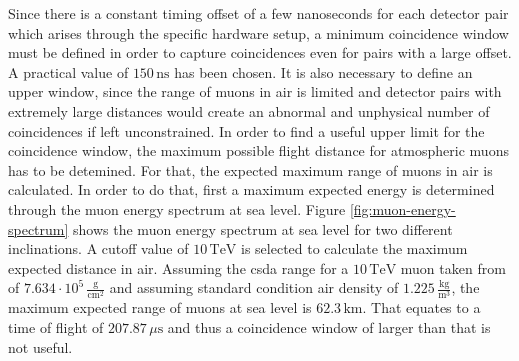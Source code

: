 \documentclass[abstract,toc,los,lof,english,10pt,glossary,acronyms,lotl]{jluthesis}
\begin{document}
Since there is a constant timing offset of a few nanoseconds for each detector pair which arises through the specific hardware setup, a minimum coincidence window must be defined in order to capture coincidences even for pairs with a large offset. A practical value of $150\,\text{ns}$ has been chosen.
It is also necessary to define an upper window, since the range of muons in air is limited and detector pairs with extremely large distances would create an abnormal and unphysical number of coincidences if left unconstrained. In order to find a useful upper limit for the coincidence window, the maximum possible flight distance for atmospheric muons has to be detemined. For that, the expected maximum range of muons in air is calculated. In order to do that, first a maximum expected energy is determined through the muon energy spectrum at sea level. Figure \ref{fig:muon-energy-spectrum} shows the muon energy spectrum at sea level for two different inclinations. A cutoff value of $10\,\text{TeV}$ is selected to calculate the maximum expected distance in air. Assuming the \acrfull{csda} range for a $10\,\text{TeV}$ muon taken from \cite{muon-range} of $7.634\cdot10^5\,\frac{\text{g}}{\text{cm}^2}$ and assuming standard condition air density of $1.225\,\frac{\text{kg}}{\text{m}^3}$, the maximum expected range of muons at sea level is $62.3\,\text{km}$. That equates to a time of flight of $207.87\,\mu\text{s}$ and thus a coincidence window of larger than that is not useful.
\end{document}

